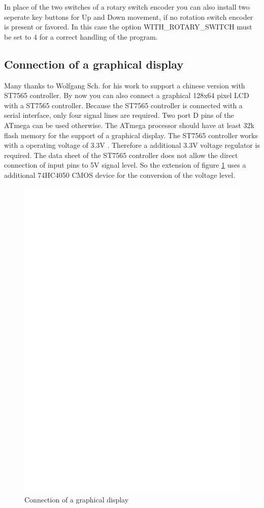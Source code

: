 In place of the two switches of a rotary switch encoder you can also install two seperate
key buttons for Up and Down movement, if no rotation switch encoder is present or favored.
In this case the option WITH\_ROTARY\_SWITCH must be set to 4 for a correct handling of
the program.

\subsection{Connection of a graphical display}

Many thanks to Wolfgang Sch. for his work to support a chinese version with ST7565 controller.
By now you can also connect a graphical 128x64 pixel LCD with a ST7565 controller.
Because the ST7565 controller is connected with a serial interface, only four signal
lines are required. Two port D pins of the ATmega can be used otherwise.
The ATmega processor should have at least 32k flash memory for the support of a graphical display.
The ST7565 controller works with a operating voltage of 3.3V .
Therefore a additional 3.3V voltage regulator is required.
The data sheet of the ST7565 controller does not allow the direct connection of input pins to
5V signal level. So the extension of figure \ref{fig:ST7565lcd} uses a additional 74HC4050 CMOS
device for the conversion of the voltage level.

\begin{figure}[H]
\centering
\includegraphics[width=14cm]{../FIG/ST7565lcd.eps}
\caption{Connection of a  graphical display}
\label{fig:ST7565lcd}
\end{figure}

